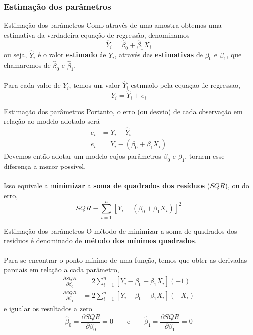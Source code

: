 \documentclass[10pt]{beamer}\usepackage[]{graphicx}\usepackage[]{color}
\theoremstyle{definition}
\begin{document}
\subsubsection[Estimação]{Estimação dos parâmetros}

\begin{frame}[fragile]{Estimação dos parâmetros}
  Como através de uma amostra obtemos uma estimativa da verdadeira
  equação de regressão, denominamos
  \begin{equation*}
    \hat{Y}_i = \hat{\beta}_0 + \hat{\beta}_1 X_i
  \end{equation*}
  ou seja, $\hat{Y}_i$ é o valor \textbf{estimado} de $Y_i$, através
  das \textbf{estimativas} de $\beta_0$ e $\beta_1$, que chamaremos de
  $\hat{\beta}_0$ e $\hat{\beta}_1$. \\~\\
  Para cada valor de $Y_i$, temos um valor $\hat{Y}_i$ estimado pela
  equação de regressão,
  \begin{equation*}
    Y_i = \hat{Y}_i + e_i
  \end{equation*}
\end{frame}

\begin{frame}[fragile]{Estimação dos parâmetros}
  Portanto, o erro (ou desvio) de cada observação em relação ao modelo
  adotado será
  \begin{align*}
    e_i &= Y_i - \hat{Y}_i \\
    e_i &= Y_i - (\beta_0 + \beta_1 X_i)
  \end{align*}
  Devemos então adotar um modelo cujos parâmetros $\beta_0$ e
  $\beta_1$, tornem esse diferença a menor possível. \\~\\
  Isso equivale a \textbf{minimizar} a \textbf{soma de quadrados dos
  resíduos} ($SQR$), ou do erro,
  \begin{equation*}
  SQR = \sum_{i=1}^{n} [Y_i - (\beta_0 + \beta_1 X_i)]^2
\end{equation*}
\end{frame}

\begin{frame}[fragile]{Estimação dos parâmetros}
  O método de minimizar a soma de quadrados dos resíduos é denominado de
  \textbf{método dos mínimos quadrados}. \\~\\
  Para se encontrar o ponto mínimo de uma função, temos que obter as
  derivadas parciais em relação a cada parâmetro,
  \begin{align*}
    \frac{\partial SQR}{\partial \beta_0} &= 2 \sum_{i=1}^{n} [Y_i -
    \beta_0 - \beta_1 X_i] (-1) \\
    \frac{\partial SQR}{\partial \beta_1} &= 2 \sum_{i=1}^{n} [Y_i -
    \beta_0 - \beta_1 X_i] (-X_i)
  \end{align*}
  e igualar os resultados a zero
  \begin{equation*}
    \hat{\beta}_0 = \frac{\partial SQR}{\partial \beta_0} = 0 \qquad
    \text{e} \qquad
    \hat{\beta}_1 = \frac{\partial SQR}{\partial \beta_1} = 0
  \end{equation*}
\end{frame}
\end{document}
